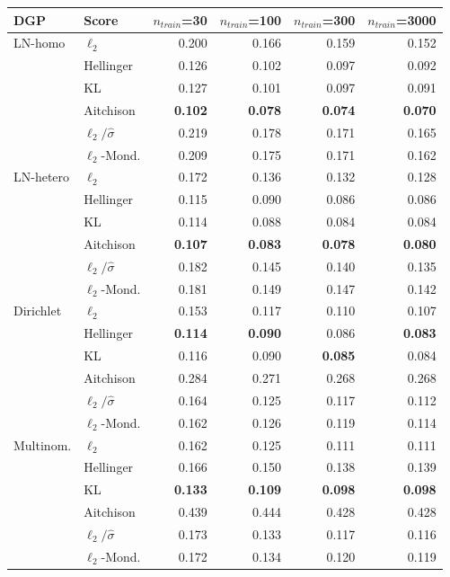 \begin{tabular}{llrrrr}
\toprule
DGP & Score & $n_{train}$=30 & $n_{train}$=100 & $n_{train}$=300 & $n_{train}$=3000 \\
\midrule
LN-homo & $\ell_2$ & 0.200 & 0.166 & 0.159 & 0.152 \\
 & Hellinger & 0.126 & 0.102 & 0.097 & 0.092 \\
 & KL & 0.127 & 0.101 & 0.097 & 0.091 \\
 & Aitchison & \textbf{0.102} & \textbf{0.078} & \textbf{0.074} & \textbf{0.070} \\
 & $\ell_2/\hat\sigma$ & 0.219 & 0.178 & 0.171 & 0.165 \\
 & $\ell_2$-Mond. & 0.209 & 0.175 & 0.171 & 0.162 \\
\midrule
LN-hetero & $\ell_2$ & 0.172 & 0.136 & 0.132 & 0.128 \\
 & Hellinger & 0.115 & 0.090 & 0.086 & 0.086 \\
 & KL & 0.114 & 0.088 & 0.084 & 0.084 \\
 & Aitchison & \textbf{0.107} & \textbf{0.083} & \textbf{0.078} & \textbf{0.080} \\
 & $\ell_2/\hat\sigma$ & 0.182 & 0.145 & 0.140 & 0.135 \\
 & $\ell_2$-Mond. & 0.181 & 0.149 & 0.147 & 0.142 \\
\midrule
Dirichlet & $\ell_2$ & 0.153 & 0.117 & 0.110 & 0.107 \\
 & Hellinger & \textbf{0.114} & \textbf{0.090} & 0.086 & \textbf{0.083} \\
 & KL & 0.116 & 0.090 & \textbf{0.085} & 0.084 \\
 & Aitchison & 0.284 & 0.271 & 0.268 & 0.268 \\
 & $\ell_2/\hat\sigma$ & 0.164 & 0.125 & 0.117 & 0.112 \\
 & $\ell_2$-Mond. & 0.162 & 0.126 & 0.119 & 0.114 \\
\midrule
Multinom. & $\ell_2$ & 0.162 & 0.125 & 0.111 & 0.111 \\
 & Hellinger & 0.166 & 0.150 & 0.138 & 0.139 \\
 & KL & \textbf{0.133} & \textbf{0.109} & \textbf{0.098} & \textbf{0.098} \\
 & Aitchison & 0.439 & 0.444 & 0.428 & 0.428 \\
 & $\ell_2/\hat\sigma$ & 0.173 & 0.133 & 0.117 & 0.116 \\
 & $\ell_2$-Mond. & 0.172 & 0.134 & 0.120 & 0.119 \\
\bottomrule
\end{tabular}